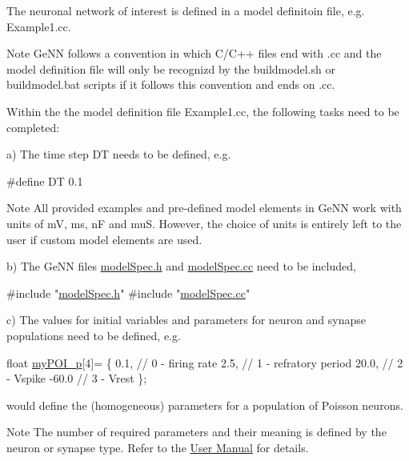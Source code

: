 \begin{DoxyEnumerate}
\item The neuronal network of interest is defined in a model definitoin file, e.\+g. {\ttfamily Example1.\+cc}. \begin{DoxyNote}{Note}
Ge\+N\+N follows a convention in which C/\+C++ files end with {\ttfamily .cc} and the model definition file will only be recognizd by the {\ttfamily buildmodel.\+sh} or {\ttfamily buildmodel.\+bat} scripts if it follows this convention and ends on {\ttfamily .cc}.
\end{DoxyNote}

\item Within the the model definition file {\ttfamily Example1.\+cc}, the following tasks need to be completed\+:

a) The time step {\ttfamily D\+T} needs to be defined, e.\+g. 
\begin{DoxyCode}
\textcolor{preprocessor}{#define DT 0.1}
\end{DoxyCode}
 \begin{DoxyNote}{Note}
All provided examples and pre-\/defined model elements in Ge\+N\+N work with units of m\+V, ms, n\+F and mu\+S. However, the choice of units is entirely left to the user if custom model elements are used.
\end{DoxyNote}
b) The Ge\+N\+N files {\ttfamily \hyperlink{modelSpec_8h}{model\+Spec.\+h}} and {\ttfamily \hyperlink{modelSpec_8cc}{model\+Spec.\+cc}} need to be included, 
\begin{DoxyCode}
\textcolor{preprocessor}{#include "\hyperlink{modelSpec_8h}{modelSpec.h}"}
\textcolor{preprocessor}{#include "\hyperlink{modelSpec_8cc}{modelSpec.cc}"}
\end{DoxyCode}
 c) The values for initial variables and parameters for neuron and synapse populations need to be defined, e.\+g. 
\begin{DoxyCode}
\textcolor{keywordtype}{float} \hyperlink{tmp_2model_2MBody__userdef_8cc_aa8fe3267f630659c3634841347ae2e09}{myPOI\_p}[4]= \{
  0.1,        \textcolor{comment}{// 0 - firing rate}
  2.5,        \textcolor{comment}{// 1 - refratory period}
  20.0,       \textcolor{comment}{// 2 - Vspike}
  -60.0       \textcolor{comment}{// 3 - Vrest}
\};
\end{DoxyCode}
 would define the (homogeneous) parameters for a population of Poisson neurons. \begin{DoxyNote}{Note}
The number of required parameters and their meaning is defined by the neuron or synapse type. Refer to the \hyperlink{UserManual}{User Manual} for details. ~\newline

\end{DoxyNote}
\end{DoxyEnumerate}
